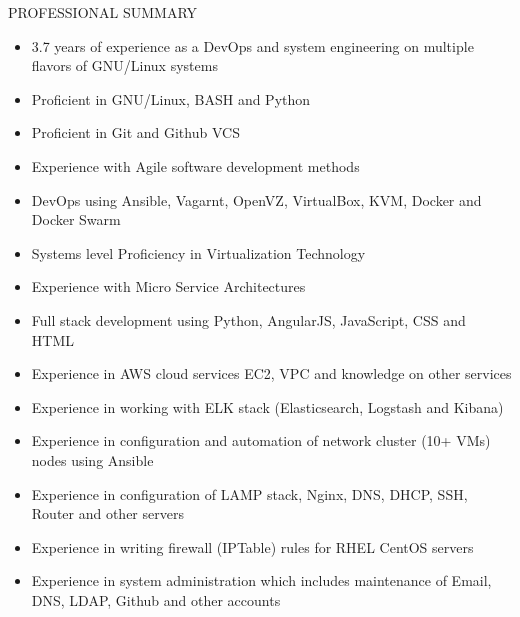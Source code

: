 \documentclass{resume} %
\begin{document}
\begin{rSection}{PROFESSIONAL SUMMARY}
  
  \begin{itemize}
    
  \item 3.7 years of experience as a DevOps and system engineering on
    multiple flavors of GNU/Linux systems

  \item Proficient in GNU/Linux, BASH and Python

  \item Proficient in Git and Github VCS

  \item Experience with Agile software development methods

  \item DevOps using Ansible, Vagarnt, OpenVZ, VirtualBox,
    KVM, Docker and Docker Swarm

  \item Systems level Proficiency in Virtualization
        Technology
  
  \item Experience with Micro Service Architectures

  \item Full stack development using Python, AngularJS,
    JavaScript, CSS and HTML

  \item Experience in AWS cloud services EC2, VPC and knowledge on
    other services

  \item Experience in working with ELK stack (Elasticsearch,
    Logstash and Kibana)
    

  \item Experience in configuration and automation of
    network cluster (10+ VMs) nodes using Ansible
    
  \item Experience in configuration of LAMP stack,
    Nginx, DNS, DHCP, SSH, Router and other servers

  \item Experience in writing firewall (IPTable) rules for
    RHEL CentOS servers

  \item Experience in system administration which includes maintenance
    of Email, DNS, LDAP, Github and other accounts


\end{itemize}
\end{rSection}
\end{document}
